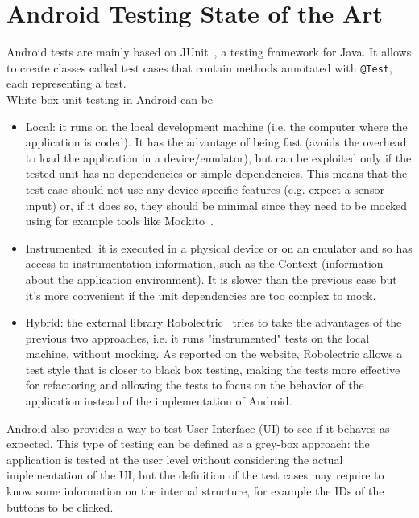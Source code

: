 \documentclass[11pt,a4paper,notitlepage]{article}
\begin{document}
\section{Android Testing State of the Art}
Android tests are mainly based on JUnit~\cite{JUnit}, a testing framework for Java. It allows to create classes called test cases that contain methods annotated with \texttt{@Test}, each representing a test.\bigskip \\
White-box unit testing in Android can be
\begin{itemize}
	\item Local: it runs on the local development machine (i.e. the computer where the application is coded). It has the advantage of being fast (avoids the overhead to load the application in a device/emulator), but can be exploited only if the tested unit has no dependencies or simple dependencies. This means that the test case should not use any device-specific features (e.g. expect a sensor input) or, if it does so, they should be minimal since they need to be mocked using for example tools like Mockito~\cite{Mockito}.
	\item Instrumented: it is executed in a physical device or on an emulator and so has access to instrumentation information, such as the Context (information about the application environment). It is slower than the previous case but it's more convenient if the unit dependencies are too complex to mock.
	\item Hybrid: the external library Robolectric~\cite{Robolectric} tries to take the advantages of the previous two approaches, i.e. it runs "instrumented" tests on the local machine, without mocking. As reported on the website, Robolectric allows a test style that is closer to black box testing, making the tests more effective for refactoring and allowing the tests to focus on the behavior of the application instead of the implementation of Android.
\end{itemize}\bigskip
Android also provides a way to test User Interface (UI) to see if it behaves as expected. This type of testing can be defined as a grey-box approach: the application is tested at the user level without considering the actual implementation of the UI, but the definition of the test cases may require to know some information on the internal structure, for example the IDs of the buttons to be clicked.
\end{document}
